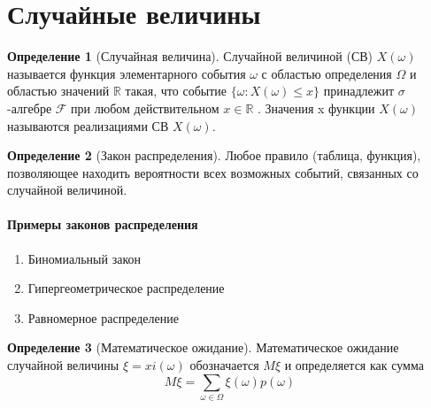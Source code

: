 \documentclass[a4paper]{article}
\theoremstyle{definition}
\newtheorem*{definition}{Определение}
\theoremstyle{remark}
\begin{document}
\section{Случайные величины}
\begin{definition}[Случайная величина]
    Случайной величиной (СВ) $X(\omega)$ называется функция элементарного события $\omega$ с областью определения $\Omega$
и областью значений $\mathbb{R}$ такая, что событие $\{\omega : X(\omega) \leq x\}$ принадлежит $\sigma$ -алгебре $\mathcal{F}$ при любом действительном $x \in \mathbb{R}$ . Значения x функции $X(\omega)$ называются реализациями СВ $X(\omega)$.    
\end{definition}
\begin{definition}[Закон распределения]
    Любое правило (таблица, функция), позволяющее находить вероятности всех возможных событий, связанных со случайной величиной.
\end{definition}
\paragraph*{Примеры законов распределения}
\begin{enumerate}
    \item Биномиальный закон
    \item Гипергеометрическое распределение
    \item Равномерное распределение
\end{enumerate}
\begin{definition}[Математическое ожидание]
    Математическое ожидание случайной величины $\xi = xi(\omega)$ обозначается $M\xi$ и определяется как сумма
    \[M\xi = \sum_{\omega \in \Omega} \xi(\omega) p(\omega)\]
\end{definition}
\end{document}
